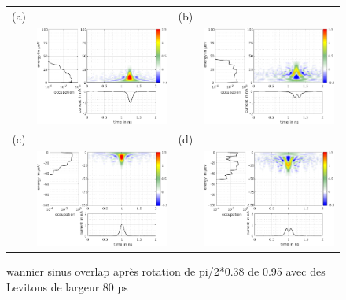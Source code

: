 \begin{figure}[hptb]
	\begin{center}
		\begin{tabular}{c c c c}
			(a) & & (b) & \\ 
			& \includegraphics[width = 6.5 cm]{./appC/wannierwigData_sinus_Projected_Gradient_Method-el-0} & & \includegraphics[width = 6.5 cm]{./appC/wannierwigData_sinus_Projected_Gradient_Method-el-1} \\
			(c) & & (d) & \\
			& \includegraphics[width = 6.5 cm]{./appC/wannierwigData_sinus_Projected_Gradient_Method-ho-0} & & \includegraphics[width = 6.5 cm]{./appC/wannierwigData_sinus_Projected_Gradient_Method-ho-1}
		\end{tabular}
	\end{center}
	
	\caption{wannier sinus overlap après rotation de pi/2*0.38 de 0.95 avec des Levitons de largeur 80 ps}
	\label{fig: wannier sinus}
\end{figure}

